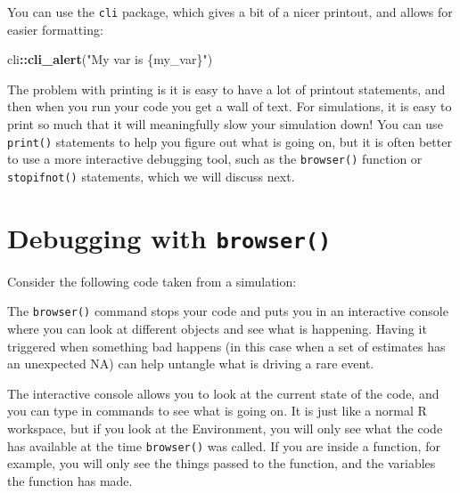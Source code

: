 \documentclass[
]{book}
\newenvironment{Shaded}{\begin{snugshade}}{\end{snugshade}}
\newcommand{\ControlFlowTok}[1]{\textcolor[rgb]{0.13,0.29,0.53}{\textbf{#1}}}
\newcommand{\FunctionTok}[1]{\textcolor[rgb]{0.13,0.29,0.53}{\textbf{#1}}}
\newcommand{\NormalTok}[1]{#1}
\newcommand{\SpecialCharTok}[1]{\textcolor[rgb]{0.81,0.36,0.00}{\textbf{#1}}}
\newcommand{\StringTok}[1]{\textcolor[rgb]{0.31,0.60,0.02}{#1}}
\begin{document}
You can use the \texttt{cli} package, which gives a bit of a nicer printout, and allows for easier formatting:

\begin{Shaded}
\begin{Highlighting}[]
\NormalTok{cli}\SpecialCharTok{::}\FunctionTok{cli\_alert}\NormalTok{(}\StringTok{"My var is \{my\_var\}"}\NormalTok{)}
\end{Highlighting}
\end{Shaded}

The problem with printing is it is easy to have a lot of printout statements, and then when you run your code you get a wall of text.
For simulations, it is easy to print so much that it will meaningfully slow your simulation down!
You can use \texttt{print()} statements to help you figure out what is going on, but it is often better to use a more interactive debugging tool, such as the \texttt{browser()} function or \texttt{stopifnot()} statements, which we will discuss next.

\section{\texorpdfstring{Debugging with \texttt{browser()}}{Debugging with browser()}}\label{about-browser-debugging}

Consider the following code taken from a simulation:

\begin{Shaded}
\end{Shaded}

The \texttt{browser()} command stops your code and puts you in an interactive console where you can look at different objects and see what is happening.
Having it triggered when something bad happens (in this case when a set of estimates has an unexpected NA) can help untangle what is driving a rare event.

The interactive console allows you to look at the current state of the code, and you can type in commands to see what is going on.
It is just like a normal R workspace, but if you look at the Environment, you will only see what the code has available at the time \texttt{browser()} was called.
If you are inside a function, for example, you will only see the things passed to the function, and the variables the function has made.
\end{document}
